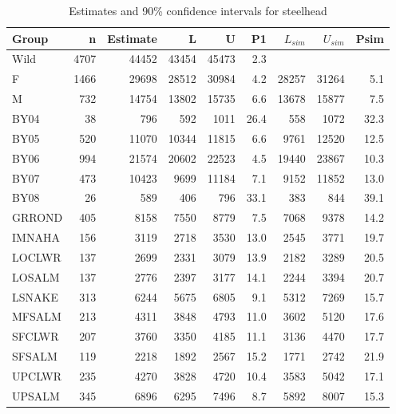 \documentclass[11pt]{article}
\begin{document}
\begin{table}
\caption{Estimates and 90\% confidence intervals for steelhead}
\label{table:SHresults90} 
\begin{center}
\begin{tabular}{|l|r|r|r|r|r|r|r|r|}
\hline Group &n& Estimate & L & U & P1 & $L_{sim}$ & $U_{sim}$ & Psim \\ 
\hline  Wild&4707&44452  &43454  &45473  & 2.3  & & &  \\ 
\hline  F&1466&29698&28512&30984&4.2&28257&31264&5.1  \\
\hline  M&732&14754&13802&15735&6.6&13678&15877&7.5  \\
\hline  BY04&38&796&592&1011&26.4&558&1072&32.3  \\
\hline  BY05&520&11070&10344&11815&6.6&9761&12520&12.5  \\
\hline  BY06&994&21574&20602&22523&4.5&19440&23867&10.3  \\
\hline  BY07&473&10423&9699&11184&7.1&9152&11852&13.0  \\
\hline  BY08&26&589&406&796&33.1&383&844&39.1  \\
\hline  GRROND &405&8158 &7550 &8779 &7.5  &7068 &9378 &14.2  \\ 
\hline  IMNAHA &156&3119 &2718 &3530 &13.0  &2545 &3771 &19.7  \\ 
\hline  LOCLWR &137&2699 &2331 &3079 &13.9  &2182 &3289 &20.5  \\ 
\hline  LOSALM &137&2776 &2397 &3177 &14.1  &2244 &3394 &20.7  \\ 
\hline  LSNAKE &313&6244 &5675 &6805 &9.1  &5312 &7269 &15.7  \\ 
\hline  MFSALM &213&4311 &3848 &4793 &11.0  &3602 &5120 &17.6  \\ 
\hline  SFCLWR &207&3760 &3350 &4185 &11.1  &3136 &4470 &17.7  \\ 
\hline  SFSALM &119&2218 &1892 &2567 &15.2  &1771 &2742 &21.9  \\ 
\hline  UPCLWR &235&4270 &3828 &4720 &10.4  &3583 &5042 &17.1  \\ 
\hline  UPSALM &345&6896 &6295 &7496 &8.7  &5892 &8007 &15.3  \\
\hline 
\end{tabular}
\end{center}
\end{table}
\end{document}
